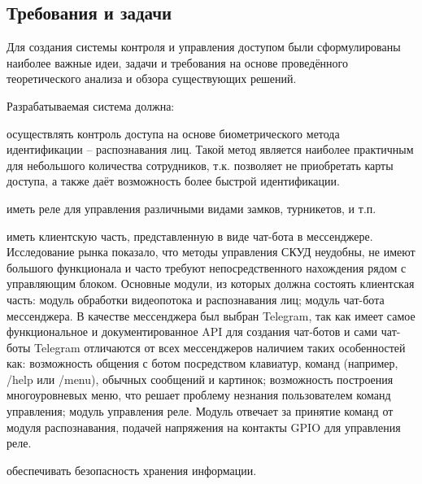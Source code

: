 \subsection{Требования и задачи}

Для создания системы контроля и управления доступом были сформулированы наиболее важные идеи, задачи и требования на основе проведённого теоретического анализа и обзора существующих решений.

Разрабатываемая система должна:

\begin{itemize*}
\item осуществлять контроль доступа на основе биометрического метода идентификации -- распознавания лиц. Такой метод является наиболее практичным для небольшого количества сотрудников, т.к. позволяет не приобретать карты доступа, а также даёт возможность более быстрой идентификации.
\item иметь реле для управления различными видами замков, турникетов, и т.п.
\item иметь клиентскую часть, представленную в виде чат-бота в мессенджере. Исследование рынка показало, что методы управления СКУД неудобны, не имеют большого функционала и часто требуют непосредственного нахождения рядом с управляющим блоком. Основные модули, из которых должна состоять клиентская часть: модуль обработки видеопотока и распознавания лиц; модуль чат-бота мессенджера. В качестве мессенджера был выбран Telegram, так как имеет самое функциональное и документированное API для создания чат-ботов и сами чат-боты Telegram отличаются от всех мессенджеров наличием таких особенностей как: возможность общения с ботом посредством клавиатур, команд (например, /help или /menu), обычных сообщений и картинок; возможность построения многоуровневых меню, что решает проблему незнания пользователем команд управления; модуль управления реле. Модуль отвечает за принятие команд от модуля распознавания, подачей напряжения на контакты GPIO для управления реле.
\item обеспечивать безопасность хранения информации.
\end{itemize*}
